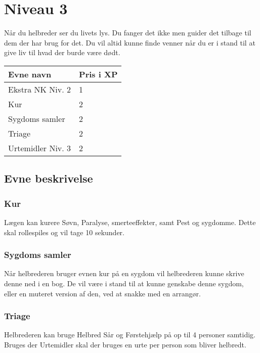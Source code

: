 \chapter*{Niveau 3}
Når du helbreder ser du livets lys. Du fanger det ikke men guider det tilbage til dem der har brug for det. Du vil altid kunne finde venner når du er i stand til at give liv til hvad der burde være dødt. 
\begin{table}[H]
    \centering
    \begin{tabular}{|p{}|p{}|}
    \rowcolor{cerulean!80}\hline
        Evne navn & Pris i XP \\\hline
        Ekstra NK Niv. 2 & 1\\\hline
        Kur & 2\\\hline
        Sygdoms samler & 2 \\\hline
        Triage & 2\\\hline
        Urtemidler Niv. 3 & 2 \\\hline
    \end{tabular}
\end{table}
\section*{Evne beskrivelse}



\subsection*{Kur}
Lægen kan kurere Søvn, Paralyse, smerteeffekter, samt Pest og
sygdomme. Dette skal rollespiles og vil tage 10 sekunder.

\subsection*{Sygdoms samler}
Når helbrederen bruger evnen kur på en sygdom vil helbrederen kunne skrive denne ned i en bog. De vil være i stand til at kunne genskabe denne sygdom, eller en muteret version af den, ved at snakke med en arrangør.

\subsection*{Triage}
Helbrederen kan bruge Helbred Sår og Førstehjælp på op til 4 personer samtidig. Bruges der Urtemidler skal der bruges en urte per person som bliver helbredt.


